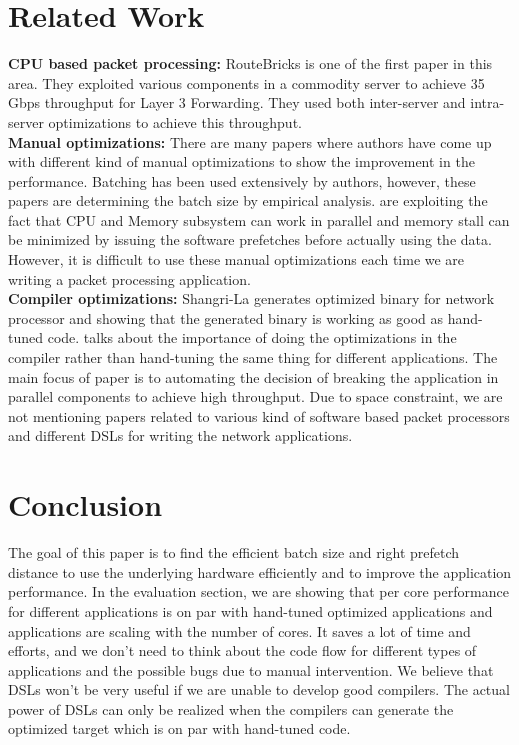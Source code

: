 \section{Related Work}
\label{relatedwork}
\textbf{CPU based packet processing:} RouteBricks\cite{dobrescu2009routebricks} is one of the first paper in this area. They exploited various components in a commodity server to achieve 35 Gbps throughput for Layer 3 Forwarding. They used both inter-server and intra-server optimizations to achieve this throughput.
\\
\textbf{Manual optimizations:} There are many papers where authors have come up with different kind of manual optimizations to show the improvement in the performance. Batching\cite{dobrescu2009routebricks, 189006, Kim:2012:PBC:2349896.2349910, Zhou:2013:SHP:2535372.2535379} has been used extensively by authors, however, these papers are determining the batch size by empirical analysis. \cite{189006, Zhou:2013:SHP:2535372.2535379} are exploiting the fact that CPU and Memory subsystem can work in parallel and memory stall can be minimized by issuing the software prefetches before actually using the data. However, it is difficult to use these manual optimizations each time we are writing a packet processing application.
\\
\textbf{Compiler optimizations:} Shangri-La \cite{Chen:2005:SAH:1065010.1065038} generates optimized binary for network processor and showing that the generated binary is working as good as hand-tuned code. \cite{Dobrescu:2010:CPM:1921151.1921154} talks about the importance of doing the optimizations in the compiler rather than hand-tuning the same thing for different applications. The main focus of paper \cite{Dobrescu:2010:CPM:1921151.1921154} is to automating the decision of breaking the application in parallel components to achieve high throughput.
Due to space constraint, we are not mentioning papers related to various kind of software based packet processors and different DSLs for writing the network applications.

\section{Conclusion}
\label{section6} 
The goal of this paper is to find the efficient batch size and right prefetch distance to use the underlying hardware efficiently and to improve the application performance. In the evaluation section, we are showing that per core performance for different applications is on par with hand-tuned optimized applications and applications are scaling with the number of cores. It saves a lot of time and efforts, and we don't need to think about the code flow for different types of applications and the possible bugs due to manual intervention. We believe that DSLs won't be very useful if we are unable to develop good compilers. The actual power of DSLs can only be realized when the compilers can generate the optimized target which is on par with hand-tuned code.